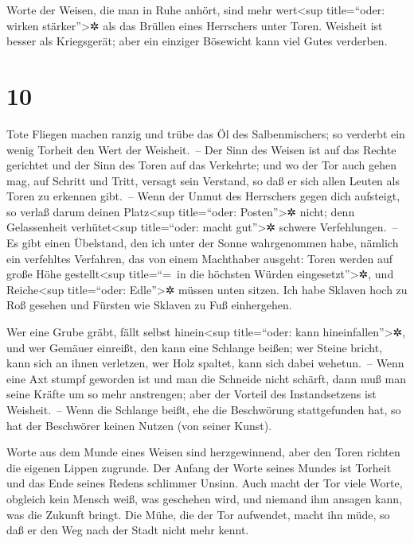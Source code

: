 Worte der Weisen, die man in Ruhe anhört, sind mehr
wert\textless sup title=``oder: wirken stärker''\textgreater✲ als das
Brüllen eines Herrschers unter Toren. Weisheit ist besser
als Kriegsgerät; aber ein einziger Bösewicht kann viel Gutes verderben.

\hypertarget{section-9}{%
\section{10}\label{section-9}}

Tote Fliegen machen ranzig und trübe das Öl des
Salbenmischers; so verderbt ein wenig Torheit den Wert der Weisheit.~--
Der Sinn des Weisen ist auf das Rechte gerichtet und der
Sinn des Toren auf das Verkehrte; und wo der Tor auch
gehen mag, auf Schritt und Tritt, versagt sein Verstand, so daß er sich
allen Leuten als Toren zu erkennen gibt.~-- Wenn der Unmut
des Herrschers gegen dich aufsteigt, so verlaß darum deinen
Platz\textless sup title=``oder: Posten''\textgreater✲ nicht; denn
Gelassenheit verhütet\textless sup title=``oder: macht
gut''\textgreater✲ schwere Verfehlungen.~-- Es gibt einen
Übelstand, den ich unter der Sonne wahrgenommen habe, nämlich ein
verfehltes Verfahren, das von einem Machthaber ausgeht:
Toren werden auf große Höhe gestellt\textless sup
title=``=~in die höchsten Würden eingesetzt''\textgreater✲, und
Reiche\textless sup title=``oder: Edle''\textgreater✲ müssen unten
sitzen. Ich habe Sklaven hoch zu Roß gesehen und Fürsten
wie Sklaven zu Fuß einhergehen.

Wer eine Grube gräbt, fällt selbst hinein\textless sup
title=``oder: kann hineinfallen''\textgreater✲, und wer Gemäuer
einreißt, den kann eine Schlange beißen; wer Steine
bricht, kann sich an ihnen verletzen, wer Holz spaltet, kann sich dabei
wehetun.~-- Wenn eine Axt stumpf geworden ist und man die
Schneide nicht schärft, dann muß man seine Kräfte um so mehr anstrengen;
aber der Vorteil des Instandsetzens ist Weisheit.~-- Wenn
die Schlange beißt, ehe die Beschwörung stattgefunden hat, so hat der
Beschwörer keinen Nutzen (von seiner Kunst).

Worte aus dem Munde eines Weisen sind herzgewinnend, aber
den Toren richten die eigenen Lippen zugrunde. Der Anfang
der Worte seines Mundes ist Torheit und das Ende seines Redens schlimmer
Unsinn. Auch macht der Tor viele Worte, obgleich kein
Mensch weiß, was geschehen wird, und niemand ihm ansagen kann, was die
Zukunft bringt. Die Mühe, die der Tor aufwendet, macht
ihn müde, so daß er den Weg nach der Stadt nicht mehr kennt.

